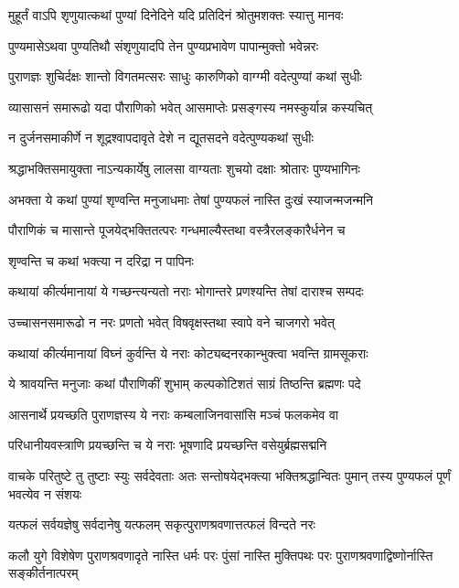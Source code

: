 \twolineshloka
{मुहूर्तं वाऽपि शृणुयात्कथां पुण्यां दिनेदिने}
{यदि प्रतिदिनं श्रोतुमशक्तः स्यात्तु मानवः} %

\twolineshloka
{पुण्यमासेऽथवा पुण्यतिथौ संशृणुयादपि}
{तेन पुण्यप्रभावेण पापान्मुक्तो भवेन्नरः} %

\twolineshloka
{पुराणज्ञः शुचिर्दक्षः शान्तो विगतमत्सरः}
{साधुः कारुणिको वाग्ग्मी वदेत्पुण्यां कथां सुधीः} %

\twolineshloka
{व्यासासनं समारूढो यदा पौराणिको भवेत्}
{आसमाप्तेः प्रसङ्गस्य नमस्कुर्यान्न कस्यचित्} %

\twolineshloka
{न दुर्जनसमाकीर्णे न शूद्रश्वापदावृते}
{देशे न द्यूतसदने वदेत्पुण्यकथां सुधीः} %

\twolineshloka
{श्रद्धाभक्तिसमायुक्ता नाऽन्यकार्येषु लालसा}
{वाग्यताः शुचयो दक्षाः श्रोतारः पुण्यभागिनः} %

\twolineshloka
{अभक्ता ये कथां पुण्यां शृण्वन्ति मनुजाधमाः}
{तेषां पुण्यफलं नास्ति दुःखं स्याजन्मजन्मनि} %

\twolineshloka
{पौराणिकं च मासान्ते पूजयेद्भक्तितत्परः}
{गन्धमाल्यैस्तथा वस्त्रैरलङ्कारैर्धनेन च} %


\onelineshloka
{शृण्वन्ति च कथां भक्त्या न दरिद्रा न पापिनः} %

\twolineshloka
{कथायां कीर्त्यमानायां ये गच्छन्त्यन्यतो नराः}
{भोगान्तरे प्रणश्यन्ति तेषां दाराश्च सम्पदः} %

\twolineshloka
{उच्चासनसमारूढो न नरः प्रणतो भवेत्}
{विषवृक्षस्तथा स्वापे वने चाजगरो भवेत्} %

\twolineshloka
{कथायां कीर्त्यमानायां विघ्नं कुर्वन्ति ये नराः}
{कोट्यब्दनरकान्भुक्त्वा भवन्ति ग्रामसूकराः} %

\twolineshloka
{ये श्रावयन्ति मनुजाः कथां पौराणिकीं शुभाम्}
{कल्पकोटिशतं साग्रं तिष्ठन्ति ब्रह्मणः पदे} %

\twolineshloka
{आसनार्थे प्रयच्छति पुराणज्ञस्य ये नराः}
{कम्बलाजिनवासांसि मञ्चं फलकमेव वा} %

\twolineshloka
{परिधानीयवस्त्राणि प्रयच्छन्ति च ये नराः}
{भूषणादि प्रयच्छन्ति वसेयुर्ब्रह्मसद्मनि} %

\threelineshloka
{वाचके परितुष्टे तु तुष्टाः स्युः सर्वदेवताः}
{अतः सन्तोषयेद्भक्त्या भक्तिश्रद्धान्वितः पुमान्}
{तस्य पुण्यफलं पूर्णं भवत्येव न संशयः} %

\twolineshloka
{यत्फलं सर्वयज्ञेषु सर्वदानेषु यत्फलम्}
{सकृत्पुराणश्रवणात्तत्फलं विन्दते नरः} %

\threelineshloka
{कलौ युगे विशेषेण पुराणश्रवणादृते}
{नास्ति धर्मः परः पुंसां नास्ति मुक्तिपथः परः}
{पुराणश्रवणाद्विष्णोर्नास्ति सङ्कीर्तनात्परम्} %

